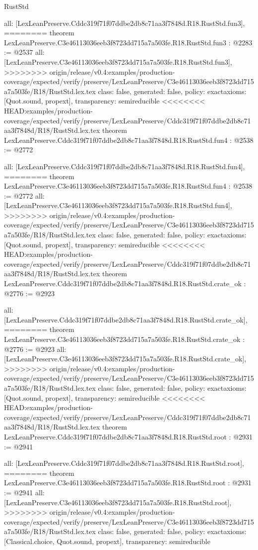 \begin{lexlean}{RustStd}
\begin{coremodule}
{\begin{coremodule}
{{{{{{  all: [LexLeanPreserve.Cddc319f71f07ddbe2db8c71aa3f7848d.R18.RustStd.fun3],
========
theorem LexLeanPreserve.C3e46113036eeb3f8723dd715a7a503fe.R18.RustStd.fun3 : @2283 := @2537 {
  all: [LexLeanPreserve.C3e46113036eeb3f8723dd715a7a503fe.R18.RustStd.fun3],
>>>>>>>> origin/release/v0.4:examples/production-coverage/expected/verify/preserve/LexLeanPreserve/C3e46113036eeb3f8723dd715a7a503fe/R18/RustStd.lex.tex
  class: false,
  generated: false,
  policy: exact{axioms: [Quot.sound, propext]},
  transparency: semireducible
}
<<<<<<<< HEAD:examples/production-coverage/expected/verify/preserve/LexLeanPreserve/Cddc319f71f07ddbe2db8c71aa3f7848d/R18/RustStd.lex.tex
theorem LexLeanPreserve.Cddc319f71f07ddbe2db8c71aa3f7848d.R18.RustStd.fun4 : @2538 := @2772 {
  all: [LexLeanPreserve.Cddc319f71f07ddbe2db8c71aa3f7848d.R18.RustStd.fun4],
========
theorem LexLeanPreserve.C3e46113036eeb3f8723dd715a7a503fe.R18.RustStd.fun4 : @2538 := @2772 {
  all: [LexLeanPreserve.C3e46113036eeb3f8723dd715a7a503fe.R18.RustStd.fun4],
>>>>>>>> origin/release/v0.4:examples/production-coverage/expected/verify/preserve/LexLeanPreserve/C3e46113036eeb3f8723dd715a7a503fe/R18/RustStd.lex.tex
  class: false,
  generated: false,
  policy: exact{axioms: [Quot.sound, propext]},
  transparency: semireducible
}
<<<<<<<< HEAD:examples/production-coverage/expected/verify/preserve/LexLeanPreserve/Cddc319f71f07ddbe2db8c71aa3f7848d/R18/RustStd.lex.tex
theorem LexLeanPreserve.Cddc319f71f07ddbe2db8c71aa3f7848d.R18.RustStd.crate_ok : @2776 := @2923 {
  all: [LexLeanPreserve.Cddc319f71f07ddbe2db8c71aa3f7848d.R18.RustStd.crate_ok],
========
theorem LexLeanPreserve.C3e46113036eeb3f8723dd715a7a503fe.R18.RustStd.crate_ok : @2776 := @2923 {
  all: [LexLeanPreserve.C3e46113036eeb3f8723dd715a7a503fe.R18.RustStd.crate_ok],
>>>>>>>> origin/release/v0.4:examples/production-coverage/expected/verify/preserve/LexLeanPreserve/C3e46113036eeb3f8723dd715a7a503fe/R18/RustStd.lex.tex
  class: false,
  generated: false,
  policy: exact{axioms: [Quot.sound, propext]},
  transparency: semireducible
}
<<<<<<<< HEAD:examples/production-coverage/expected/verify/preserve/LexLeanPreserve/Cddc319f71f07ddbe2db8c71aa3f7848d/R18/RustStd.lex.tex
theorem LexLeanPreserve.Cddc319f71f07ddbe2db8c71aa3f7848d.R18.RustStd.root : @2931 := @2941 {
  all: [LexLeanPreserve.Cddc319f71f07ddbe2db8c71aa3f7848d.R18.RustStd.root],
========
theorem LexLeanPreserve.C3e46113036eeb3f8723dd715a7a503fe.R18.RustStd.root : @2931 := @2941 {
  all: [LexLeanPreserve.C3e46113036eeb3f8723dd715a7a503fe.R18.RustStd.root],
>>>>>>>> origin/release/v0.4:examples/production-coverage/expected/verify/preserve/LexLeanPreserve/C3e46113036eeb3f8723dd715a7a503fe/R18/RustStd.lex.tex
  class: false,
  generated: false,
  policy: exact{axioms: [Classical.choice, Quot.sound, propext]},
  transparency: semireducible
}

}}}}}}}}}
\end{coremodule}}
\end{coremodule}
\end{lexlean}
